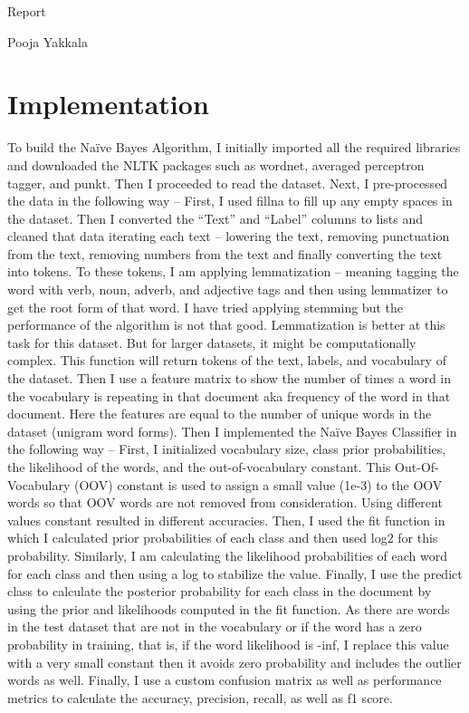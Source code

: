 \documentclass{article}
\begin{document}
\begin{titlepage}
\begin{center} 

        \Huge{Report} \vspace{1cm} 
        
        \large{Pooja Yakkala} \vspace{0.3cm} 
        
    \end{center} 
\end{titlepage}

\section*{Implementation}

To build the Naïve Bayes Algorithm, I initially imported all the required libraries and downloaded the NLTK packages such as wordnet, averaged perceptron tagger, and punkt. Then I proceeded to read the dataset. Next, I pre-processed the data in the following way – First, I used fillna to fill up any empty spaces in the dataset. Then I converted the “Text” and “Label” columns to lists and cleaned that data iterating each text – lowering the text, removing punctuation from the text, removing numbers from the text and finally converting the text into tokens. To these tokens, I am applying lemmatization – meaning tagging the word with verb, noun, adverb, and adjective tags and then using lemmatizer to get the root form of that word. I have tried applying stemming but the performance of the algorithm is not that good. Lemmatization is better at this task for this dataset. But for larger datasets, it might be computationally complex. This function will return tokens of the text, labels, and vocabulary of the dataset. Then I use a feature matrix to show the number of times a word in the vocabulary is repeating in that document aka frequency of the word in that document. Here the features are equal to the number of unique words in the dataset (unigram word forms).
Then I implemented the Naïve Bayes Classifier in the following way – First, I initialized vocabulary size, class prior probabilities, the likelihood of the words, and the out-of-vocabulary constant. This Out-Of-Vocabulary (OOV) constant is used to assign a small value (1e-3) to the OOV words so that OOV words are not removed from consideration. Using different values constant resulted in different accuracies. Then, I used the fit function in which I calculated prior probabilities of each class and then used log2 for this probability. Similarly, I am calculating the likelihood probabilities of each word for each class and then using a log to stabilize the value. Finally, I use the predict class to calculate the posterior probability for each class in the document by using the prior and likelihoods computed in the fit function. As there are words in the test dataset that are not in the vocabulary or if the word has a zero probability in training, that is, if the word likelihood is -inf, I replace this value with a very small constant then it avoids zero probability and includes the outlier words as well. Finally, I use a custom confusion matrix as well as performance metrics to calculate the accuracy, precision, recall, as well as f1 score.
\end{document}
